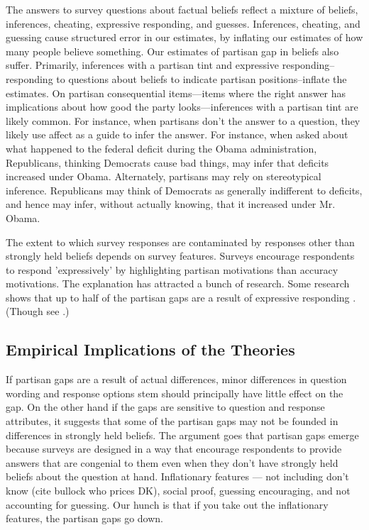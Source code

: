 \documentclass[12pt, letterpaper]{article}
\begin{document}
The answers to survey questions about factual beliefs reflect a mixture of beliefs, inferences, cheating, expressive responding, and guesses. Inferences, cheating, and guessing cause structured error in our estimates, by inflating our estimates of how many people believe something. Our estimates of partisan gap in beliefs also suffer. Primarily, inferences with a partisan tint and expressive responding--responding to questions about beliefs to indicate partisan positions--inflate the estimates. On partisan consequential items---items where the right answer has implications about how good the party looks---inferences with a partisan tint are likely common. For instance, when partisans don't the answer to a question, they likely use affect as a guide to infer the answer. For instance, when asked about what happened to the federal deficit during the Obama administration, Republicans, thinking Democrats cause bad things, may infer that deficits increased under Obama. Alternately, partisans may rely on stereotypical inference. Republicans may think of Democrats as generally indifferent to deficits, and hence may infer, without actually knowing, that it increased under Mr. Obama. 

The extent to which survey responses are contaminated by responses other than strongly held beliefs depends on survey features. Surveys encourage respondents to respond 'expressively' by highlighting partisan motivations than accuracy motivations. \citep{Zaller1992} The explanation has attracted a bunch of research. Some research shows that up to half of the partisan gaps are a result of expressive responding \citep{bullocketal_2015,huber_yair_2018, prior2015you}. (Though see \cite{berinsky_2017}.)

\subsection*{Empirical Implications of the Theories}

If partisan gaps are a result of actual differences, minor differences in question wording and response options stem should principally have little effect on the gap. On the other hand if the gaps are sensitive to question and response attributes, it suggests that some of the partisan gaps may not be founded in differences in strongly held beliefs. The argument goes that partisan gaps emerge because surveys are designed in a way that encourage respondents to provide answers that are congenial to them even when they don't have strongly held beliefs about the question at hand. Inflationary features --- not including don't know (cite bullock who prices DK), social proof, guessing encouraging, and not accounting for guessing. Our hunch is that if you take out the inflationary features, the partisan gaps go down.
\end{document}
